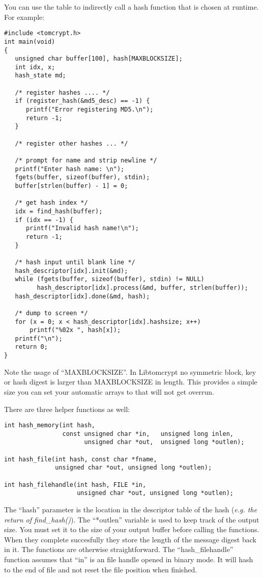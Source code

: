 \documentclass[a4paper]{book}
\begin{document}
You can use the table to indirectly call a hash function that is chosen at runtime.  For example:
\begin{small}
\begin{verbatim}
#include <tomcrypt.h>
int main(void)
{
   unsigned char buffer[100], hash[MAXBLOCKSIZE];
   int idx, x;
   hash_state md;

   /* register hashes .... */
   if (register_hash(&md5_desc) == -1) {
      printf("Error registering MD5.\n");
      return -1;
   }

   /* register other hashes ... */

   /* prompt for name and strip newline */
   printf("Enter hash name: \n");
   fgets(buffer, sizeof(buffer), stdin);
   buffer[strlen(buffer) - 1] = 0;

   /* get hash index */
   idx = find_hash(buffer);
   if (idx == -1) {
      printf("Invalid hash name!\n");
      return -1;
   }

   /* hash input until blank line */
   hash_descriptor[idx].init(&md);
   while (fgets(buffer, sizeof(buffer), stdin) != NULL)
         hash_descriptor[idx].process(&md, buffer, strlen(buffer));
   hash_descriptor[idx].done(&md, hash);

   /* dump to screen */
   for (x = 0; x < hash_descriptor[idx].hashsize; x++)
       printf("%02x ", hash[x]);
   printf("\n");
   return 0;
}
\end{verbatim}
\end{small}

Note the usage of ``MAXBLOCKSIZE''.  In Libtomcrypt no symmetric block, key or hash digest is larger than MAXBLOCKSIZE in
length.  This provides a simple size you can set your automatic arrays to that will not get overrun.

There are three helper functions as well:
 
\begin{verbatim}
int hash_memory(int hash, 
                const unsigned char *in,   unsigned long inlen, 
                      unsigned char *out,  unsigned long *outlen);

int hash_file(int hash, const char *fname, 
              unsigned char *out, unsigned long *outlen);

int hash_filehandle(int hash, FILE *in, 
                    unsigned char *out, unsigned long *outlen);
\end{verbatim}

The ``hash'' parameter is the location in the descriptor table of the hash (\textit{e.g. the return of find\_hash()}).  
The ``*outlen'' variable is used to keep track of the output size.  You must set it to the size of your output buffer before 
calling the functions.  When they complete succesfully they store the length of the message digest back in it.  The functions 
are otherwise straightforward.  The ``hash\_filehandle'' function assumes that ``in'' is an file handle opened in binary mode.  
It will hash to the end of file and not reset the file position when finished.
\end{document}
